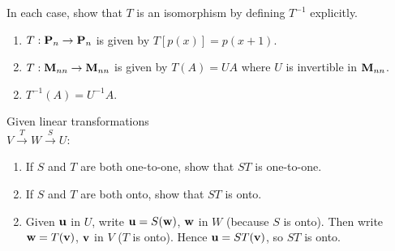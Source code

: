 \begin{multicols}{2}
\begin{ex}
\begin{sol}
\begin{enumerate}[label={\alph*.}]
\end{enumerate}
\end{sol}
\end{ex}

\begin{ex}
In each case, show that $T$ is an isomorphism by defining $T^{-1}$ explicitly.


\begin{enumerate}[label={\alph*.}]
\item $T : \textbf{P}_{n} \to \textbf{P}_{n}$ is given by $T\left[p(x)\right] = p(x + 1)$.

\item $T : \textbf{M}_{nn} \to \textbf{M}_{nn}$ is given by $T(A) = UA$ where $U$ is invertible in $\textbf{M}_{nn}$.

\end{enumerate}
\begin{sol}
\begin{enumerate}[label={\alph*.}]
\setcounter{enumi}{1}
\item $T^{-1}(A) = U^{-1} A$.

\end{enumerate}
\end{sol}
\end{ex}

\begin{ex}
Given linear transformations \\ $V \xrightarrow{T} W \xrightarrow{S} U$:

\begin{enumerate}[label={\alph*.}]
\item If $S$ and $T$ are both one-to-one, show that $ST$ is one-to-one.

\item If $S$ and $T$ are both onto, show that $ST$ is onto.

\end{enumerate}
\begin{sol}
\begin{enumerate}[label={\alph*.}]
\setcounter{enumi}{1}
\item Given $\textbf{u}$ in $U$, write $\textbf{u} = S(\textbf{w})$, $\textbf{w}$ in $W$ (because $S$ is onto). Then write $\textbf{w} = T(\textbf{v})$, $\textbf{v}$ in $V$ ($T$ is onto). Hence $\textbf{u} = ST(\textbf{v})$, so $ST$ is onto.

\end{enumerate}
\end{sol}
\end{ex}


\end{multicols}
